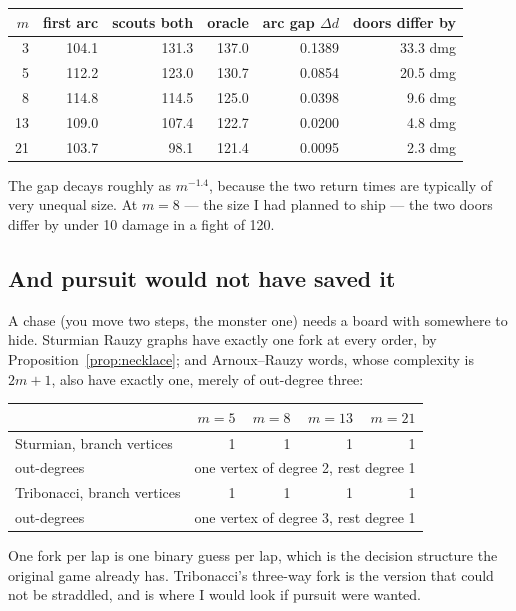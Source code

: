 \documentclass[11pt,a4paper]{article}
\theoremstyle{definition}
\theoremstyle{plain}
\theoremstyle{remark}
\begin{document}
\begin{center}
\begin{tabular}{rrrrrr}
\toprule
$m$ & first arc & scouts both & oracle & arc gap $\Delta d$ & doors differ by \\
\midrule
3  & 104.1 & 131.3 & 137.0 & 0.1389 & 33.3 dmg \\
5  & 112.2 & 123.0 & 130.7 & 0.0854 & 20.5 dmg \\
8  & 114.8 & 114.5 & 125.0 & 0.0398 & \phantom{0}9.6 dmg \\
13 & 109.0 & 107.4 & 122.7 & 0.0200 & \phantom{0}4.8 dmg \\
21 & 103.7 & \phantom{0}98.1 & 121.4 & 0.0095 & \phantom{0}2.3 dmg \\
\bottomrule
\end{tabular}
\end{center}

The gap decays roughly as $m^{-1.4}$, because the two return times are typically
of very unequal size. At $m = 8$ --- the size I had planned to ship --- the two
doors differ by under 10 damage in a fight of 120.

\subsection{And pursuit would not have saved it}

A chase (you move two steps, the monster one) needs a board with somewhere to
hide. Sturmian Rauzy graphs have exactly one fork at every order, by
Proposition~\ref{prop:necklace}; and Arnoux--Rauzy words, whose complexity is
$2m+1$, also have exactly one, merely of out-degree three:

\begin{center}
\begin{tabular}{lrrrr}
\toprule
 & $m=5$ & $m=8$ & $m=13$ & $m=21$ \\
\midrule
Sturmian, branch vertices   & 1 & 1 & 1 & 1 \\
\quad out-degrees           & \multicolumn{4}{l}{one vertex of degree 2, rest degree 1} \\
Tribonacci, branch vertices & 1 & 1 & 1 & 1 \\
\quad out-degrees           & \multicolumn{4}{l}{one vertex of degree 3, rest degree 1} \\
\bottomrule
\end{tabular}
\end{center}

One fork per lap is one binary guess per lap, which is the decision structure
the original game already has. Tribonacci's three-way fork is the version that
could not be straddled, and is where I would look if pursuit were wanted.
\end{document}
